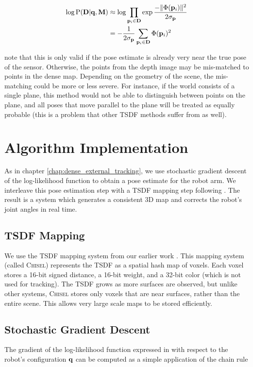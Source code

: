 \begin{align}
	\log \text{P}(\mathbf{D} | \mathbf{q}, \mathbf{M}) &\approx \log \prod_{\mathbf{p}_i \in \mathbf{D}} \exp{\frac{-\|\Phi(\mathbf{p}_i)\|^2}{2 \sigma_{\mathbf{p}}}} \\
				&= -\frac{1}{2 \sigma_{\mathbf{p}}}\sum_{\mathbf{p}_i \in \mathbf{D}}\Phi(\mathbf{p}_i)^2 
				\label{eqn:log_likelihood_dense_map}
\end{align}

\noindent note that this is only valid if the pose estimate is already very near the true pose of the sensor. Otherwise, the points from the depth image may be mis-matched to points in the dense map. Depending on the geometry of the scene, the mis-matching could be more or less severe. For instance, if the world consists of a single plane, this method would not be able to distinguish between points on the plane, and all poses that move parallel to the plane will be treated as equally probable (this is a problem that other TSDF methods suffer from as well).

\section{Algorithm Implementation}
As in chapter \ref{chap:dense_external_tracking}, we use stochastic gradient descent of the log-likelihood function to obtain a pose estimate for the robot arm. We interleave this pose estimation step with a TSDF mapping step following . The result is a system which generates a consistent 3D map and corrects the robot's joint angles in real time.

\subsection{TSDF Mapping}
We use the TSDF mapping system from our earlier work \cite{Klingensmith2015}. This mapping system (called \textsc{Chisel}) represents the TSDF as a spatial hash map of voxels. Each voxel stores a 16-bit signed distance, a 16-bit weight, and a 32-bit color (which is not used for tracking). The TSDF grows as more surfaces are observed, but unlike other systems, \textsc{Chisel} stores only voxels that are near surfaces, rather than the entire scene. This allows very large scale maps to be stored efficiently.

\subsection{Stochastic Gradient Descent}
The gradient of the log-likelihood function expressed in  with respect to the robot's configuration $\mathbf{q}$ can be computed as a simple application of the chain rule

